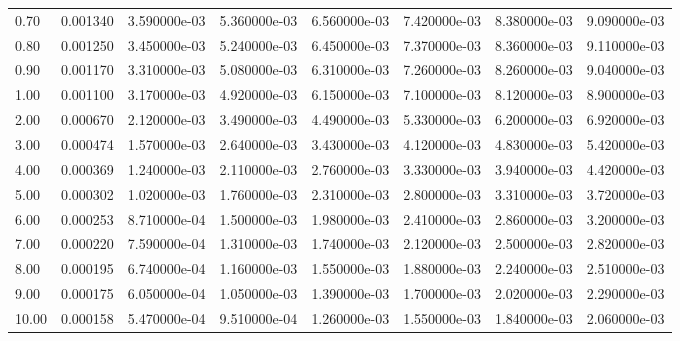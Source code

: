 \begin{tabular}{lrrrrrrr}
0.70  &  0.001340 &  3.590000e-03 &  5.360000e-03 &  6.560000e-03 &  7.420000e-03 &  8.380000e-03 &  9.090000e-03 \\
0.80  &  0.001250 &  3.450000e-03 &  5.240000e-03 &  6.450000e-03 &  7.370000e-03 &  8.360000e-03 &  9.110000e-03 \\
0.90  &  0.001170 &  3.310000e-03 &  5.080000e-03 &  6.310000e-03 &  7.260000e-03 &  8.260000e-03 &  9.040000e-03 \\
1.00  &  0.001100 &  3.170000e-03 &  4.920000e-03 &  6.150000e-03 &  7.100000e-03 &  8.120000e-03 &  8.900000e-03 \\
2.00  &  0.000670 &  2.120000e-03 &  3.490000e-03 &  4.490000e-03 &  5.330000e-03 &  6.200000e-03 &  6.920000e-03 \\
3.00  &  0.000474 &  1.570000e-03 &  2.640000e-03 &  3.430000e-03 &  4.120000e-03 &  4.830000e-03 &  5.420000e-03 \\
4.00  &  0.000369 &  1.240000e-03 &  2.110000e-03 &  2.760000e-03 &  3.330000e-03 &  3.940000e-03 &  4.420000e-03 \\
5.00  &  0.000302 &  1.020000e-03 &  1.760000e-03 &  2.310000e-03 &  2.800000e-03 &  3.310000e-03 &  3.720000e-03 \\
6.00  &  0.000253 &  8.710000e-04 &  1.500000e-03 &  1.980000e-03 &  2.410000e-03 &  2.860000e-03 &  3.200000e-03 \\
7.00  &  0.000220 &  7.590000e-04 &  1.310000e-03 &  1.740000e-03 &  2.120000e-03 &  2.500000e-03 &  2.820000e-03 \\
8.00  &  0.000195 &  6.740000e-04 &  1.160000e-03 &  1.550000e-03 &  1.880000e-03 &  2.240000e-03 &  2.510000e-03 \\
9.00  &  0.000175 &  6.050000e-04 &  1.050000e-03 &  1.390000e-03 &  1.700000e-03 &  2.020000e-03 &  2.290000e-03 \\
10.00 &  0.000158 &  5.470000e-04 &  9.510000e-04 &  1.260000e-03 &  1.550000e-03 &  1.840000e-03 &  2.060000e-03 \\
\bottomrule
\end{tabular}
